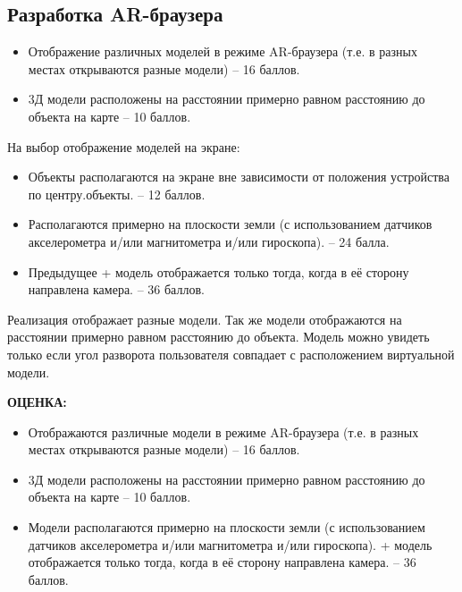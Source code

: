 \subsection*{Разработка AR-браузера}

\markSection
\begin{itemize}
    \item	Отображение различных моделей в режиме AR-браузера (т.е. в разных местах открываются разные модели) – 16 баллов.
    \item	3Д модели расположены на расстоянии примерно равном расстоянию до объекта на карте – 10 баллов.
\end{itemize}
На выбор отображение моделей на экране:
\begin{itemize}
    \item	Объекты располагаются на экране вне зависимости от положения устройства по центру.объекты. – 12 баллов.
    \item	Располагаются примерно на плоскости земли (с использованием датчиков акселерометра и/или магнитометра и/или гироскопа). – 24 балла.
    \item	Предыдущее + модель отображается только тогда, когда в её сторону направлена камера. – 36 баллов.
\end{itemize}

\solutionSection
Реализация отображает разные модели. Так же модели отображаются на расстоянии примерно равном расстоянию до объекта. 
Модель можно увидеть только если угол разворота пользователя совпадает с расположением виртуальной модели.


\textbf{ОЦЕНКА:}
\begin{itemize}
    \item	Отображаются различные модели в режиме AR-браузера (т.е. в разных местах открываются разные модели) – 16 баллов.
    \item	3Д модели расположены на расстоянии примерно равном расстоянию до объекта на карте – 10 баллов.
    \item	Модели располагаются примерно на плоскости земли (с использованием датчиков акселерометра и/или магнитометра и/или гироскопа). + модель отображается только тогда, когда в её сторону направлена камера. – 36 баллов.
\end{itemize}

